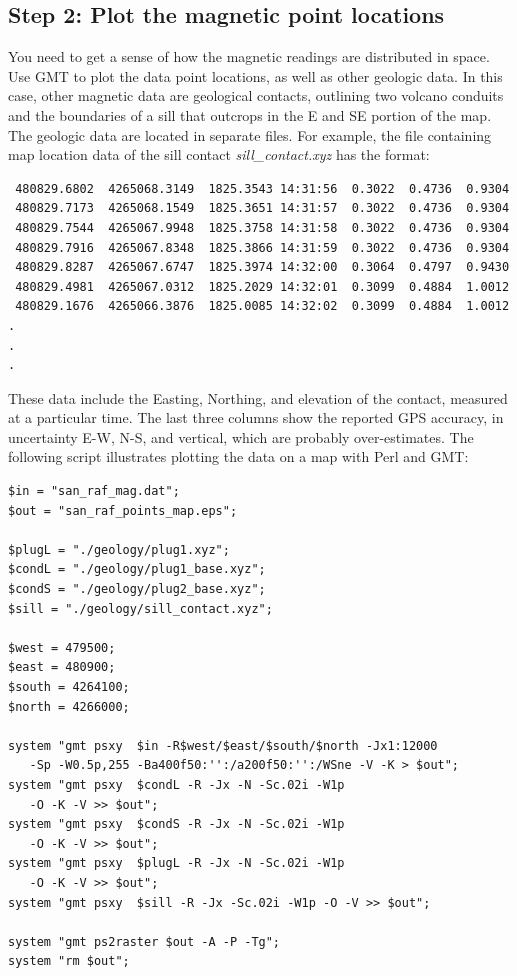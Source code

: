 \documentclass[letterpaper,10pt]{report}
\begin{document}
\subsection*{Step 2: Plot the magnetic point locations}
You need to get a sense of how the magnetic readings are distributed in space. Use GMT to plot the data point locations, as well as other geologic data. In this case, other magnetic data are geological contacts, outlining two volcano conduits and the boundaries of a sill that outcrops in the E and SE portion of the map. The geologic data are located in separate files. For example, the file containing map location data of the sill contact {\it sill\_contact.xyz} has the format:
\begin{verbatim}
 480829.6802  4265068.3149  1825.3543 14:31:56  0.3022  0.4736  0.9304
 480829.7173  4265068.1549  1825.3651 14:31:57  0.3022  0.4736  0.9304
 480829.7544  4265067.9948  1825.3758 14:31:58  0.3022  0.4736  0.9304
 480829.7916  4265067.8348  1825.3866 14:31:59  0.3022  0.4736  0.9304
 480829.8287  4265067.6747  1825.3974 14:32:00  0.3064  0.4797  0.9430
 480829.4981  4265067.0312  1825.2029 14:32:01  0.3099  0.4884  1.0012
 480829.1676  4265066.3876  1825.0085 14:32:02  0.3099  0.4884  1.0012
.
.
.
\end{verbatim}
These data include the Easting, Northing, and elevation of the contact, measured at a particular time. The last three columns show the reported GPS accuracy, in uncertainty E-W, N-S, and vertical, which are probably over-estimates. The following script illustrates plotting the data on a map with Perl and GMT:
\begin{mdframed}[style=MyFrame]
\begin{verbatim}
$in = "san_raf_mag.dat";
$out = "san_raf_points_map.eps";

$plugL = "./geology/plug1.xyz";
$condL = "./geology/plug1_base.xyz";
$condS = "./geology/plug2_base.xyz";
$sill = "./geology/sill_contact.xyz";

$west = 479500;
$east = 480900;
$south = 4264100;
$north = 4266000;

system "gmt psxy  $in -R$west/$east/$south/$north -Jx1:12000
   -Sp -W0.5p,255 -Ba400f50:'':/a200f50:'':/WSne -V -K > $out";
system "gmt psxy  $condL -R -Jx -N -Sc.02i -W1p 
   -O -K -V >> $out";
system "gmt psxy  $condS -R -Jx -N -Sc.02i -W1p
   -O -K -V >> $out";
system "gmt psxy  $plugL -R -Jx -N -Sc.02i -W1p 
   -O -K -V >> $out";
system "gmt psxy  $sill -R -Jx -Sc.02i -W1p -O -V >> $out";

system "gmt ps2raster $out -A -P -Tg";
system "rm $out";
\end{verbatim}
\end{mdframed}
\end{document}

